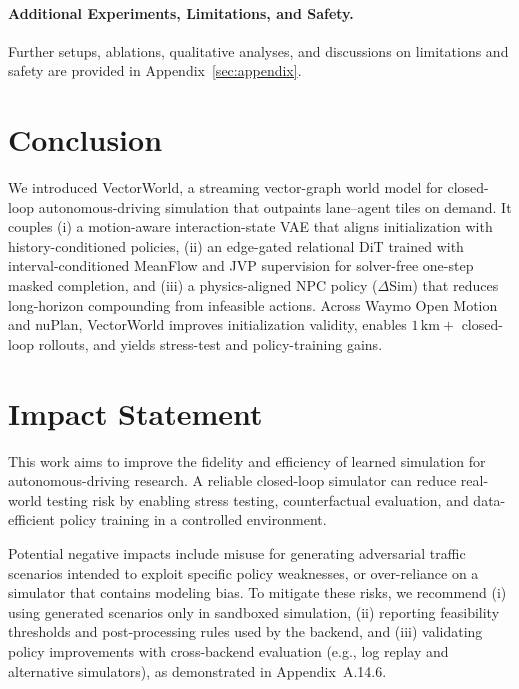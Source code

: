 \documentclass{article}
\theoremstyle{plain}
\theoremstyle{definition}
\theoremstyle{remark}
\begin{document}
\vspace{-2mm}
\paragraph{Additional Experiments, Limitations, and Safety.}
Further setups, ablations, qualitative analyses, and discussions on limitations and safety are provided in Appendix~\ref{sec:appendix}.

\section{Conclusion}
We introduced VectorWorld, a streaming vector-graph world model for closed-loop autonomous-driving simulation that outpaints lane--agent tiles on demand. It couples (i) a motion-aware interaction-state VAE that aligns initialization with history-conditioned policies,
(ii) an edge-gated relational DiT trained with interval-conditioned MeanFlow and JVP supervision for solver-free one-step masked completion,
and (iii) a physics-aligned NPC policy (\(\Delta\)Sim) that reduces long-horizon compounding from infeasible actions. Across Waymo Open Motion and nuPlan, VectorWorld improves initialization validity, enables \(1\,\mathrm{km}+\) closed-loop rollouts, and yields stress-test and policy-training gains.

\section*{Impact Statement}
This work aims to improve the fidelity and efficiency of learned simulation for autonomous-driving research.
A reliable closed-loop simulator can reduce real-world testing risk by enabling stress testing, counterfactual evaluation,
and data-efficient policy training in a controlled environment.

Potential negative impacts include misuse for generating adversarial traffic scenarios intended to exploit specific policy weaknesses,
or over-reliance on a simulator that contains modeling bias.
To mitigate these risks, we recommend (i) using generated scenarios only in sandboxed simulation,
(ii) reporting feasibility thresholds and post-processing rules used by the backend,
and (iii) validating policy improvements with cross-backend evaluation (e.g., log replay and alternative simulators),
as demonstrated in Appendix~A.14.6.




\newpage
\clearpage
\appendix
\onecolumn
\end{document}
